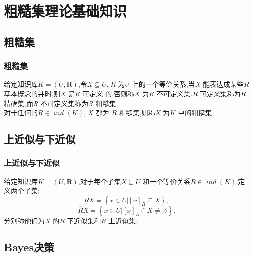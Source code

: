 \documentclass[aspectratio=169]{beamer}
\begin{document}
\section{粗糙集理论基础知识}

\frame{\tableofcontents[currentsection]}

\subsection*{粗糙集}

\begin{frame}
\frametitle{粗糙集}
\begin{definition}
  给定知识库$K=(U, \mathbf{R})$,令$X \subseteq U$, $R$ 为$U$ 上的一个等价关系,当$X$ 能表达成某些$R$ 基本概念的并时,则$X$ 是$R$ 可定义
  的,否则称$X$ 为$R$ 不可定义集.$R$ 可定义集称为$R$ 精确集,而$R$ 不可定义集称为$R$ 粗糙集.\\
  对于任何的$R \in$ $\mathit{ind}$ $(K)$, $X$ 都为 $R$ 粗糙集,则称$X$ 为$K$ 中的粗糙集. 
\end{definition}

\end{frame}

\subsection*{上近似与下近似}

\begin{frame}
  \frametitle{上近似与下近似}
  \begin{definition}
    给定知识库$K=(U, \mathbf{R})$,对于每个子集$X \subseteq U$ 和一个等价关系$R \in$ $\mathit{ind}$ $(K)$,定义两个子集:\\
    $$\underline{R} X=\left \{  x \in U|[x]_{R} \subseteq X\right \} ,$$
    $$\overline{R}  X=\left \{  x \in U|[x]_{R} \cap X \neq \varnothing\right \} .$$
    分别称他们为$X$ 的$R$ 下近似集和$R$ 上近似集.
  \end{definition}
  
\end{frame}

\subsection*{Bayes决策}
\end{document}
